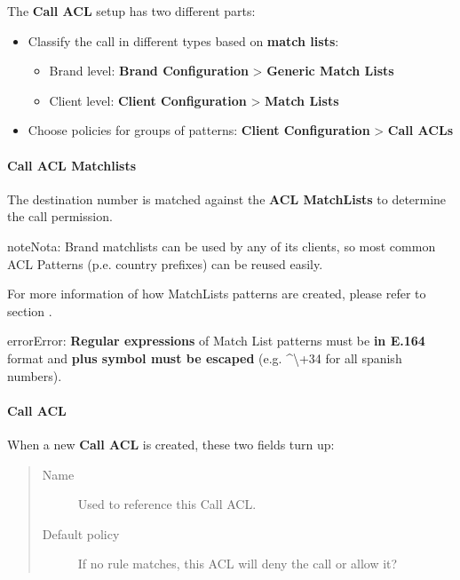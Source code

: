 \documentclass[letterpaper,10pt,spanish]{sphinxmanual}
\begin{document}
The \textbf{Call ACL} setup has two different parts:
\begin{itemize}
\item {} 
Classify the call in different types based on \textbf{match lists}:
\begin{itemize}
\item {} 
Brand level: \textbf{Brand Configuration} \textgreater{} \textbf{Generic Match Lists}

\item {} 
Client level: \textbf{Client Configuration} \textgreater{} \textbf{Match Lists}

\end{itemize}

\item {} 
Choose policies for groups of patterns: \textbf{Client Configuration} \textgreater{} \textbf{Call
ACLs}

\end{itemize}


\paragraph{Call ACL Matchlists}
\label{administration_portal/client/vpbx/user_configuration/call_acls:call-acl-matchlists}
The destination number is matched against the \textbf{ACL MatchLists} to determine
the call permission.

\begin{notice}{note}{Nota:}
Brand matchlists can be used by any of its clients, so most common
ACL Patterns (p.e. country prefixes) can be reused easily.
\end{notice}

For more information of how MatchLists patterns are created, please refer to section
{\hyperref[administration_portal/client/vpbx/routing_tools/match_lists:match\string-lists]{}}.

\begin{notice}{error}{Error:}
\textbf{Regular expressions} of Match List patterns must be \textbf{in E.164} format and \textbf{plus symbol must be
escaped} (e.g. \textasciicircum{}\textbackslash{}+34 for all spanish numbers).
\end{notice}


\paragraph{Call ACL}
\label{administration_portal/client/vpbx/user_configuration/call_acls:call-acl}
When a new \textbf{Call ACL} is created, these two fields turn up:
\begin{quote}
\begin{description}
\item[{Name}] \leavevmode
Used to reference this Call ACL.

\item[{Default policy}] \leavevmode
If no rule matches, this ACL will deny the call or allow it?

\end{description}
\end{quote}
\end{document}
